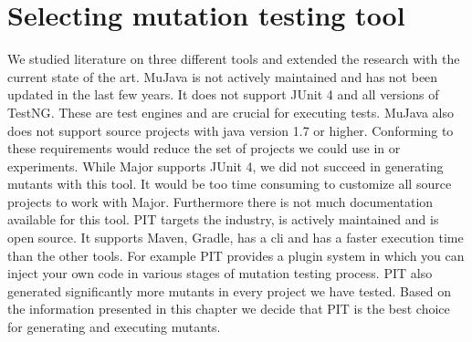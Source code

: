 \documentclass[../main]{subfiles}
\begin{document}
\section{Selecting mutation testing tool}
We studied literature on three different tools and extended the research with the current state of the art.
MuJava is not actively maintained and has not been updated in the last few years.
It does not support JUnit 4 and all versions of TestNG\cite{mujava}.
These are test engines and are crucial for executing tests.
MuJava also does not support source projects with java version 1.7 or higher\cite{mujava}.
Conforming to these requirements would reduce the set of projects we could use in or experiments.
\newline
While Major supports JUnit 4,
we did not succeed in generating mutants with this tool.
It would be too time consuming to customize all source projects to work with Major.
Furthermore there is not much documentation available for this tool.
\newline
PIT targets the industry, is actively maintained and is open source\cite{Kintis2016AnalysingStudy}.
It supports Maven, Gradle, has a \acrfull{cli} and has a faster execution time than the other tools.
For example PIT provides a plugin system in which you can inject your own code in various stages of mutation testing process\cite{pit}.
PIT also generated significantly more mutants in every project we have tested.
Based on the information presented in this chapter we decide that PIT is the best choice for generating and executing mutants.
\end{document}
